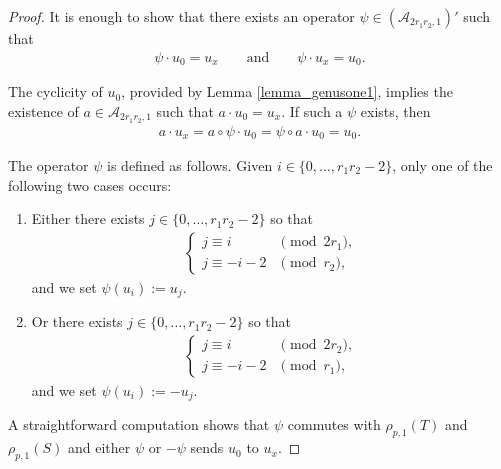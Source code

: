 \begin{proof} It is enough to show that there exists an operator $\psi \in (\mathcal{A}_{2r_1r_2,1})'$ such that
\begin{gather*} \psi \cdot u_0 = u_x \qquad \text{and} \qquad \psi \cdot u_x =u_0.\end{gather*}

The cyclicity of $u_0$, provided by Lemma \ref{lemma_genusone1}, implies the existence of $a\in\mathcal{A}_{2r_1r_2,1}$ such that
$a\cdot u_0 = u_x$. If such a $\psi$ exists, then
\begin{gather*} a\cdot u_x = a \circ \psi \cdot u_0 = \psi \circ a \cdot u_0 = u_0.\end{gather*}

The operator $\psi$ is defined as follows. Given $i\in \{0, \ldots, r_1r_2-2\}$, only one of the following two cases occurs:
\begin{enumerate}\itemsep=0pt
\item Either there exists $j\in\{0, \ldots, r_1r_2-2 \}$ so that
\begin{gather*} \begin{cases}
j\equiv i & \pmod{2r_1}, \\
j\equiv -i-2 & \pmod{r_2},
\end{cases}\end{gather*}
 and we set $\psi(u_i):=u_j$.
\item Or there exists $j\in\{0, \ldots, r_1r_2-2 \}$ so that
\begin{gather*} \begin{cases}
j\equiv i & \pmod{2r_2}, \\
j\equiv -i-2& \pmod{r_1},
\end{cases}\end{gather*}
 and we set $\psi(u_i):=-u_j$.
\end{enumerate}
A straightforward computation shows that $\psi$ commutes with $\rho_{p,1}(T)$ and $\rho_{p,1}(S)$ and either $\psi$ or $-\psi$ sends $u_0$ to $u_x$.
\end{proof}

